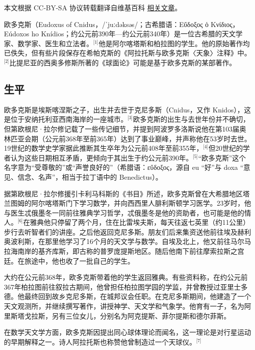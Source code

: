 
本文根据 CC-BY-SA 协议转载翻译自维基百科 \href{https://en.wikipedia.org/wiki/Eudoxus_of_Cnidus}{相关文章}。

欧多克斯（Eudoxus of Cnidus，/ˈjuːdəksəs/；古希腊语：Εὔδοξος ὁ Κνίδιος，Eúdoxos ho Knídios；约公元前390年—约公元前340年）是一位古希腊的天文学家、数学家、医生和立法者。\(^\text{[1]}\)他是阿尔喀塔斯和柏拉图的学生。他的原始著作均已佚失，但有些片段保存在希帕克斯的《阿拉托斯与欧多克斯〈天象〉注释》中。\(^\text{[2]}\)比提尼亚的西奥多修斯所著的《球面论》可能是基于欧多克斯的某部著作。
\subsection{生平}
欧多克斯是埃斯喀涅斯之子，出生并去世于克尼多斯（Cnidus，又作 Knidos），这是位于安纳托利亚西南海岸的一座城市。\(^\text{[3]}\)欧多克斯的出生与去世年份并不确切，但第欧根尼·拉尔修记载了一些传记细节，并提到阿波罗多洛斯说他在第103届奥林匹亚会期（公元前368年至前365年）达到了事业巅峰，并声称他在53岁时去世。19世纪的数学史学家据此推断其生卒年为公元前408年至前355年，\(^\text{[4]}\)但20世纪的学者认为这些日期相互矛盾，更倾向于其出生于约公元前390年。\(^\text{[5]}\)“欧多克斯”这个名字意为“受尊敬的”或“声誉良好的”（希腊语：εὔδοξος，源自 eu “好”与 doxa “意见、信念、名声”，相当于拉丁语中的 Benedictus）。

据第欧根尼·拉尔修援引卡利马科斯的《书目》所述，欧多克斯曾在大希腊地区塔兰图姆的阿尔喀塔斯门下学习数学，并向西西里人腓利斯顿学习医学。23岁时，他与医生忒俄墨冬一同前往雅典学习哲学，忒俄墨冬是他的资助者，也可能是他的情人。\(^\text{[6]}\)在雅典他只停留了两个月，住在比雷埃夫斯，每天往返七英里（约11公里）步行去听智者们的讲座。之后他返回克尼多斯。朋友们后来集资送他前往埃及赫利奥波利斯，在那里他学习了16个月的天文学与数学。自埃及北上，他又前往马尔马拉海南岸的基齐库斯，即古称的普罗庞提斯地区。随后他南下前往摩索拉斯之宫廷。在旅途中，他也收了一批自己的学生。

大约在公元前368年，欧多克斯带着他的学生返回雅典。有些资料称，在约公元前367年柏拉图前往叙拉古期间，他曾担任柏拉图学园的学监，并曾教授过亚里士多德。他最终回到故乡克尼多斯，在城邦议会任职。在克尼多斯期间，他建造了一个天文观测所，并继续撰写著作，讲授神学、天文学和气象学。他育有一子，名为阿里斯塔戈拉斯，另有三位女儿，分别名为阿克提斯、菲尔提斯和德尔菲斯。

在数学天文学方面，欧多克斯因提出同心球体理论而闻名，这一理论是对行星运动的早期解释之一。诗人阿拉托斯也称赞他曾制造过一个天球仪。\(^\text{[7]}\)

